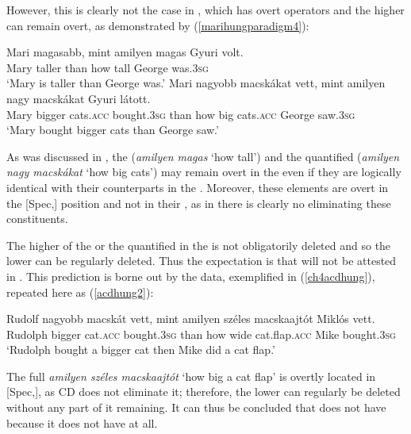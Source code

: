However, this is clearly not the case in , which has overt operators and the higher  can remain overt, as demonstrated by (\ref{marihungparadigm4}):

\ea \label{marihungparadigm4}
\ea \gll Mari	magasabb,	mint	amilyen	magas	Gyuri volt.\\
Mary	taller	than	how	tall	George was.\textsc{3sg}\\
\glt `Mary is taller than George was.'
\ex \gll	Mari	nagyobb	macsk\'akat	vett,	mint amilyen nagy	macsk\'akat	Gyuri	l\'atott.\\
Mary bigger cats.\textsc{acc} bought.\textsc{3sg} than	how big	cats.\textsc{acc} George saw.\textsc{3sg}\\
\glt `Mary bought bigger cats than George saw.'
\z
\z

As was discussed in , the  (\textit{amilyen magas} `how tall') and the quantified  (\textit{amilyen nagy macsk\'akat} `how big cats') may remain overt in the  even if they are logically identical with their counterparts in the .  Moreover, these elements are overt in the [Spec,] position and not in their , as in  there is clearly no  eliminating these constituents.

The higher  of the  or the quantified  in the  is not obligatorily deleted and so the lower  can be regularly deleted. Thus the expectation is that  will not be attested in . This prediction is borne out by the data, exemplified in (\ref{ch4acdhung}), repeated here as (\ref{acdhung2}):

\ea \label{acdhung2}
\gll Rudolf nagyobb macsk\'at vett, mint amilyen sz\'eles macskaajt\'ot Mikl\'os vett.\\
Rudolph bigger cat.\textsc{acc}	bought.\textsc{3sg} than how wide cat.flap.\textsc{acc}	Mike	bought.\textsc{3sg}\\
\glt `Rudolph bought a bigger cat then Mike did a cat flap.'
\z

The full  \textit{amilyen széles macskaajtót} `how big a cat flap' is overtly located in [Spec,], as CD does not eliminate it; therefore, the lower  can regularly be deleted without any part of it remaining. It can thus be concluded that  does not have  because it does not have  at all.


